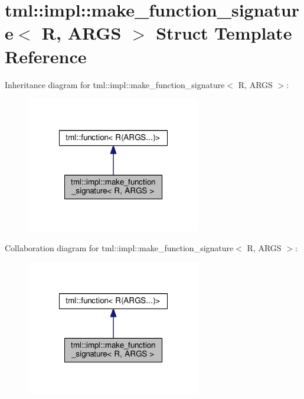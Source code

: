 \hypertarget{structtml_1_1impl_1_1make__function__signature}{\section{tml\+:\+:impl\+:\+:make\+\_\+function\+\_\+signature$<$ R, A\+R\+G\+S $>$ Struct Template Reference}
\label{structtml_1_1impl_1_1make__function__signature}
}


Inheritance diagram for tml\+:\+:impl\+:\+:make\+\_\+function\+\_\+signature$<$ R, A\+R\+G\+S $>$\+:
\nopagebreak
\begin{figure}[H]
\begin{center}
\leavevmode
\includegraphics[width=216pt]{structtml_1_1impl_1_1make__function__signature__inherit__graph}
\end{center}
\end{figure}


Collaboration diagram for tml\+:\+:impl\+:\+:make\+\_\+function\+\_\+signature$<$ R, A\+R\+G\+S $>$\+:
\nopagebreak
\begin{figure}[H]
\begin{center}
\leavevmode
\includegraphics[width=216pt]{structtml_1_1impl_1_1make__function__signature__coll__graph}
\end{center}
\end{figure}
